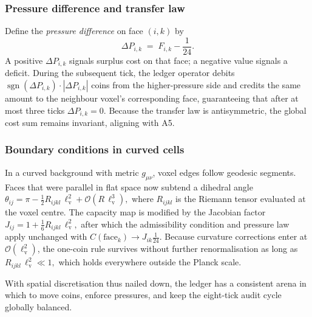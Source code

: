 \documentclass[11pt,oneside]{book}
\begin{document}
\subsubsection{Pressure difference and transfer law}
\label{subsubsec:pressure-law}
Define the \emph{pressure difference} on face $(i,k)$ by
\[
  \Delta P_{i,k}
  \;=\;
  F_{i,k}-\frac1{24}.
\]
A positive $\Delta P_{i,k}$ signals surplus cost on that face; a negative value
signals a deficit.  During the subsequent tick, the ledger operator debits
\(
  \operatorname{sgn}(\Delta P_{i,k})\!\cdot\!|\Delta P_{i,k}|
\)
coins from the higher-pressure side and credits the same amount to the
neighbour voxel’s corresponding face, guaranteeing that after at most three
ticks \(\Delta P_{i,k}=0\).  
Because the transfer law is antisymmetric, the global cost sum remains
invariant, aligning with A5.

\subsubsection{Boundary conditions in curved cells}
\label{subsubsec:curved-boundary}
In a curved background with metric $g_{\mu\nu}$, voxel edges follow geodesic
segments.  Faces that were parallel in flat space now subtend a dihedral angle
\(
  \theta_{ij} = \pi - \tfrac12 R_{ijkl}\,\ell_{\mathrm{v}}^{2} + \mathcal{O}(R\,\ell_{\mathrm{v}}^{3}),
\)
where \(R_{ijkl}\) is the Riemann tensor evaluated at the voxel centre.  The
capacity map is modified by the Jacobian factor
\(
  J_{ij} = 1 + \tfrac16 R_{ijkl}\,\ell_{\mathrm{v}}^{2},
\)
after which the admissibility condition and pressure law apply unchanged with
$C(\text{face}_{k}) \to J_{ik}\tfrac1{24}$.  Because curvature corrections
enter at $\mathcal{O}(\ell_{\mathrm{v}}^{2})$, the one-coin rule survives
without further renormalisation as long as 
\(
  R_{ijkl}\,\ell_{\mathrm{v}}^{2} \ll 1,
\)
which holds everywhere outside the Planck scale.

With spatial discretisation thus nailed down, the ledger has a consistent
arena in which to move coins, enforce pressures, and keep the eight-tick audit
cycle globally balanced.


\end{document}
